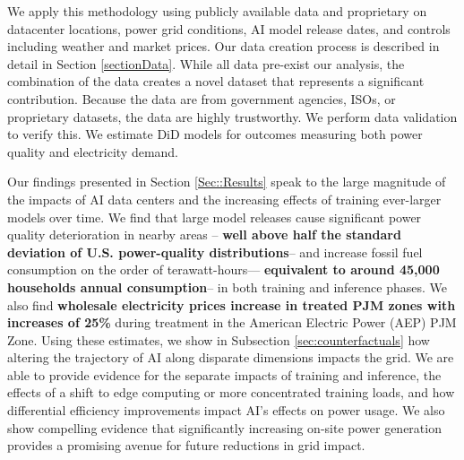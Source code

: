 \documentclass[sigconf]{acmart}
\newcommand{\nb}[1]{\textcolor{blue}{NB[#1]}}
\newcommand{\aruna}[1]{\textcolor{blue}{Aruna[#1]}}
\begin{document}


We apply this methodology using publicly available data and proprietary on datacenter locations, power grid conditions, AI model release dates, and controls including weather and market prices. Our data creation process is described in detail in Section \ref{sectionData}. While all data pre-exist our analysis, the combination of the data creates a novel dataset that represents a significant contribution. Because the data are from government agencies, ISOs, or proprietary datasets, the data are highly trustworthy. We perform data validation to verify this. We estimate DiD models for outcomes measuring both power quality and electricity demand.

Our findings presented in Section \ref{Sec::Results} speak to the large magnitude of the impacts of AI data centers and the increasing effects of training ever-larger models over time. We find that large model releases cause significant power quality deterioration in nearby areas -- \textbf{well above half the standard deviation of U.S. power-quality distributions}-- and increase fossil fuel consumption on the order of terawatt-hours--- \textbf{equivalent to around 45,000 households annual consumption}-- in both training and inference phases. We also find \textbf{wholesale electricity prices increase in treated PJM zones with increases of 25\%} during treatment in the American Electric Power (AEP) PJM Zone.
Using these estimates, we show in Subsection \ref{sec:counterfactuals} how altering the trajectory of AI along disparate dimensions impacts the grid. We are able to provide evidence for the separate impacts of training and inference, the effects of a shift to edge computing or more concentrated training loads, and how differential efficiency improvements impact AI's effects on power usage. We also show compelling evidence that significantly increasing on-site power generation provides a promising avenue for future reductions in grid impact.
\end{document}
